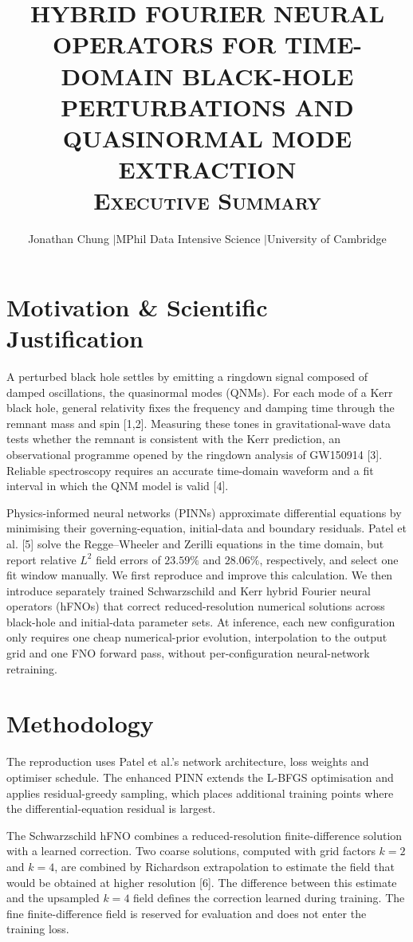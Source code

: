 \documentclass[10pt,a4paper,twocolumn]{article}
\title{\large\bfseries HYBRID FOURIER NEURAL OPERATORS FOR TIME-DOMAIN
BLACK-HOLE PERTURBATIONS AND QUASINORMAL MODE EXTRACTION\\[0.3em]
\normalfont\normalsize\scshape Executive Summary}
\author{\small Jonathan Chung \quad$|$\quad MPhil Data Intensive Science
\quad$|$\quad University of Cambridge}
\date{}
\begin{document}
\maketitle

\section{Motivation \& Scientific Justification}

A perturbed black hole settles by emitting a ringdown signal composed
of damped oscillations, the quasinormal modes (QNMs). For each mode of
a Kerr black hole, general relativity fixes the frequency and damping
time through the remnant mass and spin [1,2]. Measuring these tones in
gravitational-wave data tests whether the remnant is consistent with
the Kerr prediction, an observational programme opened by the
ringdown analysis of GW150914 [3]. Reliable spectroscopy requires an
accurate time-domain waveform and a fit interval in which the QNM
model is valid [4].

Physics-informed neural networks (PINNs) approximate differential
equations by minimising their governing-equation, initial-data and
boundary residuals. Patel et al. [5] solve the Regge--Wheeler and
Zerilli equations in the time domain, but report relative $L^2$ field
errors of $23.59\%$ and $28.06\%$, respectively, and select one fit
window manually. We first reproduce and improve this calculation. We
then introduce separately trained Schwarzschild and Kerr hybrid
Fourier neural operators (hFNOs) that correct reduced-resolution
numerical solutions across black-hole and initial-data parameter sets.
At inference, each new configuration only requires one cheap
numerical-prior evolution, interpolation to the output grid and one
FNO forward pass, without per-configuration neural-network retraining.

\section{Methodology}

The reproduction uses Patel et al.'s network architecture, loss
weights and optimiser schedule. The enhanced PINN extends the L-BFGS
optimisation and applies residual-greedy sampling, which places
additional training points where the differential-equation residual
is largest.

The Schwarzschild hFNO combines a reduced-resolution
finite-difference solution with a learned correction. Two coarse
solutions, computed with grid factors $k=2$ and $k=4$, are combined by
Richardson extrapolation to estimate the field that would be obtained
at higher resolution [6]. The difference between this estimate and
the upsampled $k=4$ field defines the correction learned during
training. The fine finite-difference field is reserved for evaluation
and does not enter the training loss.
\end{document}
